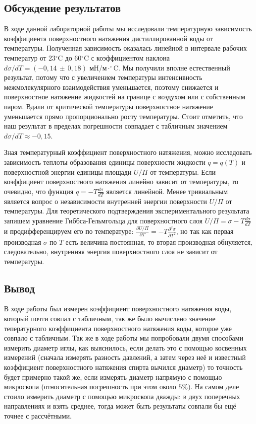 \documentclass[a4paper, 12pt]{article}
\begin{document}
\begin{center}
    \section*{Обсуждение результатов}
\end{center}

В ходе данной лабораторной работы мы исследовали температурную зависимость коэффициента поверхностного натяжения дистиллированной воды от температуры. Полученная зависимость оказалась линейной в интервале рабочих температур от 23$^\circ$C до 60$^\circ$C с коэффициентом наклона $d\sigma / dT = (-0,14\,\pm\, 0,18)$  мН/м$\cdot^\circ$C. Мы получили вполне естественный результат, потому что с увеличением температуры интенсивность межмолекулярного взаимодействия уменьшается, поэтому снижается и поверхностное натяжение жидкостей на границе с воздухом или с собственным паром. Вдали от критической температуры поверхностное натяжение уменьшается прямо пропорционально росту температуры. Стоит отметить, что наш результат в пределах погрешности совпадает с табличным значением $d\sigma / dT \approx -0,15$.
	
Зная температурный коэффициент поверхностного натяжения, можно исследовать зависимость теплоты образования единицы поверхности жидкости $q = q(T)$ и поверхностной энергии единицы площади $U/\Pi$ от температуры. Если коэффициент поверхностного натяжения линейно зависит от температуры, то очевидно, что функция $q =-T\frac{d\sigma}{dT}$ является линейной. Менее тривиальным является вопрос о независимости внутренней энергии поверхности $U/\Pi$ от температуры. Для теоретического подтверждения экспериментального результата запишем уравнение Гиббса-Гельмгольца для поверхностного слоя $U/\Pi = \sigma - T\frac{d\sigma}{dT}$ и продифференцируем его по температуре: $\frac{\partial U/\Pi}{\partial T} = -T \frac{\partial^2 \sigma}{\partial T^2}$, но так как первая производная $\sigma$ по $T$ есть величина постоянная, то вторая производная обнуляется, следовательно, внутренняя энергия поверхностного слоя не зависит от температуры.
	

\begin{center}
    \section*{Вывод}
\end{center}
 
В ходе работы был измерен коэффициент поверхностного натяжения воды, который почти совпал с табличным, так же было вычислено значение тепературного коэффициента поверхностного натяжения воды, которое уже совпало с табличным. Так же в ходе работы мы попробовали двумя способами измерить диаметр иглы, как выяснилось, если делать это с помощью косвенных измерений (сначала измерять разность давлений, а затем через неё и известный коэффициент поверхностного натяжения спирта вычился диаметр) то точность будет примерно такой же, если измерять диаметр напрямую с помощью микроскопа (относительная погрешность при этом около $5\%$). На самом деле стоило измерить диаметр с помощью микроскопа дважды: в двух поперечных направлениях и взять среднее, тогда может быть результаты совпали бы ещё точнее с рассчётными.
\end{document}
